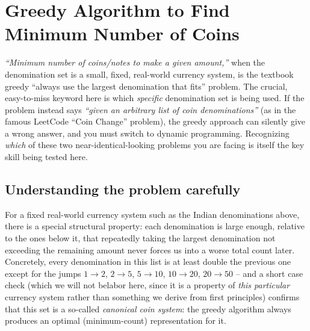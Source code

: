\section{Greedy Algorithm to Find Minimum Number of Coins}
\label{sec:minimum-coins}


\begin{patternbox}
\emph{``Minimum number of coins/notes to make a given amount,''} when the
denomination set is a small, fixed, real-world currency system, is the
textbook greedy ``always use the largest denomination that fits'' problem.
The crucial, easy-to-miss keyword here is which \emph{specific} denomination
set is being used. If the problem instead says \emph{``given an arbitrary
list of coin denominations''} (as in the famous LeetCode ``Coin Change''
problem), the greedy approach can silently give a wrong answer, and you must
switch to dynamic programming. Recognizing \emph{which} of these two
near-identical-looking problems you are facing is itself the key skill being
tested here.
\end{patternbox}

\subsection*{Understanding the problem carefully}

For a fixed real-world currency system such as the Indian denominations
above, there is a special structural property: each denomination is large
enough, relative to the ones below it, that repeatedly taking the largest
denomination not exceeding the remaining amount never forces us into a
worse total count later. Concretely, every denomination in this list is at
least double the previous one except for the jumps $1 \to 2$, $2 \to 5$,
$5 \to 10$, $10 \to 20$, $20 \to 50$ -- and a short case check (which we will
not belabor here, since it is a property of \emph{this particular} currency
system rather than something we derive from first principles) confirms that
this set is a so-called \emph{canonical coin system}: the greedy algorithm
always produces an optimal (minimum-count) representation for it.

